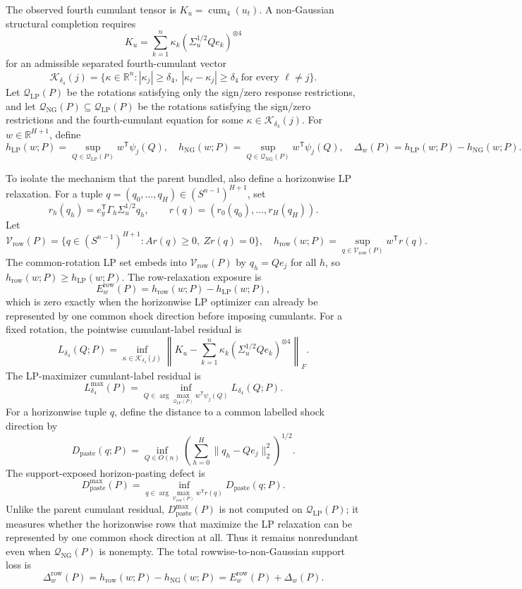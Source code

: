 \documentclass[11pt]{article}
\newcommand{\transpose}{\mathsf{T}}
\newcommand{\R}{\mathbb{R}}
\theoremstyle{definition}
\theoremstyle{plain}
\theoremstyle{remark}
\begin{document}
The observed fourth cumulant tensor is \(K_u=\operatorname{cum}_4(u_t)\).  A non-Gaussian structural completion requires
\[
K_u=\sum_{k=1}^n \kappa_k\left(\Sigma_u^{1/2}Qe_k\right)^{\otimes4}
\]
for an admissible separated fourth-cumulant vector
\[
\mathcal K_{\delta_4}(j)=\{\kappa\in\R^n:|\kappa_j|\ge\delta_4,\ |\kappa_\ell-\kappa_j|\ge\delta_4\ \text{for every }\ell\ne j\}.
\]
Let \(\mathcal Q_{\mathrm{LP}}(P)\) be the rotations satisfying only the sign/zero response restrictions, and let \(\mathcal Q_{\mathrm{NG}}(P)\subseteq\mathcal Q_{\mathrm{LP}}(P)\) be the rotations satisfying the sign/zero restrictions and the fourth-cumulant equation for some \(\kappa\in\mathcal K_{\delta_4}(j)\).  For \(w\in\R^{H+1}\), define
\[
h_{\mathrm{LP}}(w;P)=\sup_{Q\in\mathcal Q_{\mathrm{LP}}(P)}w^\transpose\psi_j(Q),\quad
h_{\mathrm{NG}}(w;P)=\sup_{Q\in\mathcal Q_{\mathrm{NG}}(P)}w^\transpose\psi_j(Q),\quad
\Delta_w(P)=h_{\mathrm{LP}}(w;P)-h_{\mathrm{NG}}(w;P).
\]

To isolate the mechanism that the parent bundled, also define a horizonwise LP relaxation.  For a tuple \(q=(q_0,\ldots,q_H)\in(S^{n-1})^{H+1}\), set
\[
r_h(q_h)=e_y^\transpose\Gamma_h\Sigma_u^{1/2}q_h,\qquad
r(q)=(r_0(q_0),\ldots,r_H(q_H)).
\]
Let
\[
\mathcal V_{\mathrm{row}}(P)=
\{q\in(S^{n-1})^{H+1}:A r(q)\ge0,\ Z r(q)=0\},
\quad
h_{\mathrm{row}}(w;P)=\sup_{q\in\mathcal V_{\mathrm{row}}(P)}w^\transpose r(q).
\]
The common-rotation LP set embeds into \(\mathcal V_{\mathrm{row}}(P)\) by \(q_h=Qe_j\) for all \(h\), so \(h_{\mathrm{row}}(w;P)\ge h_{\mathrm{LP}}(w;P)\).  The row-relaxation exposure is
\[
E_w^{\mathrm{row}}(P)=h_{\mathrm{row}}(w;P)-h_{\mathrm{LP}}(w;P),
\]
which is zero exactly when the horizonwise LP optimizer can already be represented by one common shock direction before imposing cumulants.  For a fixed rotation, the pointwise cumulant-label residual is
\[
L_{\delta_4}(Q;P)=
\inf_{\kappa\in\mathcal K_{\delta_4}(j)}
\left\|K_u-\sum_{k=1}^n\kappa_k(\Sigma_u^{1/2}Qe_k)^{\otimes4}\right\|_F.
\]
The LP-maximizer cumulant-label residual is
\[
L_{\delta_4}^{\max}(P)=\inf_{Q\in\arg\max_{\mathcal Q_{\mathrm{LP}}(P)} w^\transpose\psi_j(Q)}
L_{\delta_4}(Q;P).
\]
For a horizonwise tuple \(q\), define the distance to a common labelled shock direction by
\[
D_{\mathrm{paste}}(q;P)=
\inf_{Q\in O(n)}
\left(\sum_{h=0}^H\|q_h-Qe_j\|_2^2\right)^{1/2}.
\]
The support-exposed horizon-pasting defect is
\[
D_{\mathrm{paste}}^{\max}(P)=
\inf_{q\in\arg\max_{\mathcal V_{\mathrm{row}}(P)}w^\transpose r(q)}
D_{\mathrm{paste}}(q;P).
\]
Unlike the parent cumulant residual, \(D_{\mathrm{paste}}^{\max}(P)\) is not computed on \(\mathcal Q_{\mathrm{LP}}(P)\); it measures whether the horizonwise rows that maximize the LP relaxation can be represented by one common shock direction at all.  Thus it remains nonredundant even when \(\mathcal Q_{\mathrm{NG}}(P)\) is nonempty.
The total rowwise-to-non-Gaussian support loss is
\[
\Delta_w^{\mathrm{row}}(P)=h_{\mathrm{row}}(w;P)-h_{\mathrm{NG}}(w;P)
=E_w^{\mathrm{row}}(P)+\Delta_w(P).
\]
\end{document}
